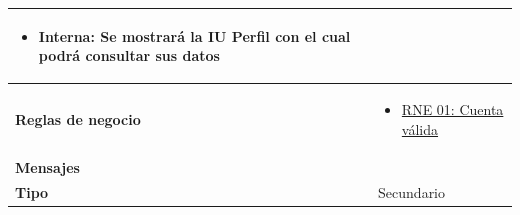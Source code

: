\begin{center}
\begin{longtable}{| p{3.5cm} | p{11.5cm} |}
\begin{itemize}
	              \item Interna: Se mostrará la IU Perfil con el cual podrá consultar sus datos
	            \end{itemize} \\
        \hline
          \textbf{Reglas de negocio} & 
		\begin{itemize}
	         	  \item {\hyperref[rnr_01]{RNE 01: Cuenta válida}}
		 \end{itemize} \\
        \hline
          \textbf{Mensajes} & \\
        \hline
          \textbf{Tipo} & Secundario\\
        \hline      
  \end{longtable}
\end{center}
\endgroup

